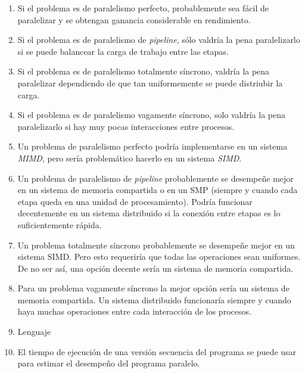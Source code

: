 \begin{enumerate}

    \item Si el problema es de paralelismo perfecto, probablemente sea fácil de
    paralelizar y se obtengan ganancia considerable en rendimiento.

    \item Si el problema es de paralelismo de \textit{pipeline}, sólo valdría
    la pena paralelizarlo si se puede balancear la carga de trabajo entre las
    etapas.

    \item Si el problema es de paralelismo totalmente síncrono, valdría la pena
    paralelizar dependiendo de que tan uniformemente se puede distriubir la
    carga.

    \item Si el problema es de paralelismo vagamente síncrono, solo valdría la
    pena paralelizarlo si hay muy pocas interacciones entre procesos.

    \item Un problema de paralelismo perfecto podría implementarse en un sistema
        \textit{MIMD}, pero sería problemático hacerlo en un sistema \textit{SIMD}.

    \item Un problema de paralelismo de \textit{pipeline} probablemente se
    desempeñe mejor en un sistema de memoria compartida o en un SMP (siempre y
    cuando cada etapa queda en una unidad de procesamiento). Podría funcionar
    decentemente en un sistema distribuido si la conexión entre etapas es lo
    suficientemente rápida.
    
    \item Un problema totalmente síncrono probablemente se desempeñe mejor en un
    sistema SIMD. Pero esto requeriría que todas las operaciones sean uniformes.
    De no ser así, una opción decente sería un sistema de memoria compartida.
    
    \item Para un problema vagamente síncrono la mejor opción sería un sistema
    de memoria compartida. Un sistema distribuido funcionaría siempre y cuando
    haya muchas operaciones entre cada interacción de los procesos.
    
    \item Lenguaje
    
    \item El tiempo de ejecución de una versión secuencia del programa se puede
    usar para estimar el desempeño del programa paralelo.
    

\end{enumerate}

